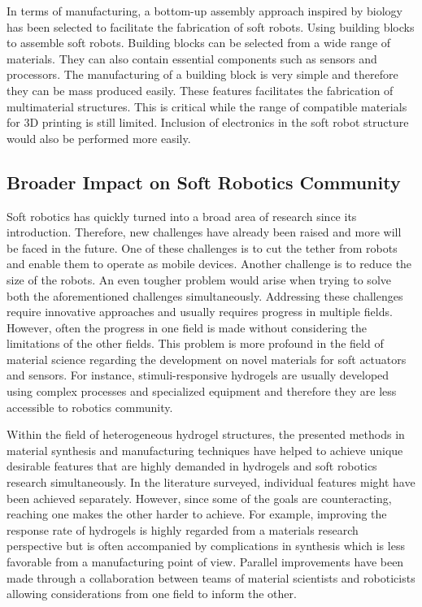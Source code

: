 In terms of manufacturing, a bottom-up assembly approach inspired by biology has been selected to facilitate the fabrication of soft robots. Using building blocks to assemble soft robots. Building blocks can be selected from a wide range of materials. They can also contain essential components such as sensors and processors. The manufacturing of a building block is very simple and therefore they can be mass produced easily. These features facilitates the fabrication of multimaterial structures. This is critical while the range of compatible materials for 3D printing is still limited.  Inclusion of electronics in the soft robot structure would also be performed more easily.  
\subsection{Broader Impact on Soft Robotics Community}
Soft robotics has quickly turned into a broad area of research since its introduction. Therefore, new challenges have already been raised and more will be faced in the future. One of these challenges is to cut the tether from robots and enable them to operate as mobile devices. Another challenge is to reduce the size of the robots. An even tougher problem would arise when trying to solve both the aforementioned challenges simultaneously. Addressing these challenges require innovative approaches and usually requires progress in multiple fields. However, often the progress in one field is made without considering the limitations of the other fields. This problem is more profound in the field of material science regarding the development on novel materials for soft actuators and sensors. For instance, stimuli-responsive hydrogels are usually developed using complex processes and specialized equipment and therefore they are less accessible to robotics community. 

Within the field of heterogeneous hydrogel structures, the presented methods in material synthesis and manufacturing techniques have helped to achieve unique desirable features that are highly demanded in hydrogels and soft robotics research simultaneously. In the literature surveyed, individual features might have been achieved separately. However, since some of the goals are counteracting, reaching one makes the other harder to achieve. For example, improving the response rate of hydrogels is highly regarded from a materials research perspective but is often accompanied by complications in synthesis which is less favorable from a manufacturing point of view. Parallel improvements have been made through a collaboration between teams of material scientists and roboticists allowing considerations from one field to inform the other.  

